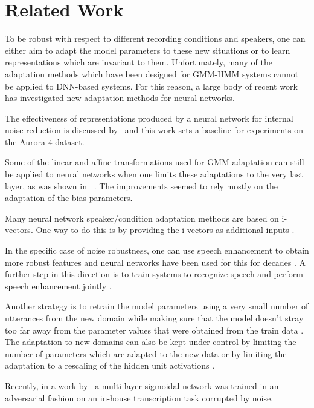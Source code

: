 \documentclass[a4paper]{article}
\begin{document}
\section{Related Work}
\label{sec:relatedwork}
    To be robust with respect to different recording conditions and speakers,
    one can either aim to adapt the model parameters to these new situations or
    to learn representations which are invariant to them.
    Unfortunately, many of the adaptation methods which have been designed for
    GMM-HMM systems cannot be applied to DNN-based systems. For this reason, a
    large body of recent work has investigated new adaptation methods for neural
    networks.

    The effectiveness of representations produced by a neural network for internal 
    noise reduction is discussed by~\cite{yu2013feature} and this work sets a 
    baseline for experiments on the Aurora-4 dataset.

    Some of the linear and affine transformations used for GMM adaptation can
    still be applied to neural networks when one limits these adaptations to the
    very last layer, as was shown in~ \cite{yao2012adaptation}. The
    improvements seemed to rely mostly on the adaptation of the bias parameters.

    Many neural network speaker/condition adaptation methods are based on
    i-vectors. One way to do this is by providing the i-vectors as additional
    inputs \cite{senior2014improving}.

    In the specific case of noise robustness, one can use speech enhancement to
    obtain more robust features and neural networks have been used for this for
    decades \cite{knecht1995neural}. A further step in this direction is to train
    systems to recognize speech and perform speech enhancement jointly \cite{narayanan2014joint}. 

    Another strategy is to retrain the model parameters using a very small
    number of utterances from the new domain while making sure that the model
    doesn't stray too far away from the parameter values that were obtained from
    the train data \cite{yu2013kl}.
    The adaptation to new domains can also be kept under control by limiting
    the number of parameters which are adapted to the new data or by limiting the
    adaptation to a rescaling of the hidden unit activations
    \cite{swietojanski2014learning}.

    Recently, in a work by~\cite{yusuke2016adversarial} a multi-layer sigmoidal network was trained 
    in an adversarial fashion on an in-house transcription task corrupted by noise.
\end{document}
